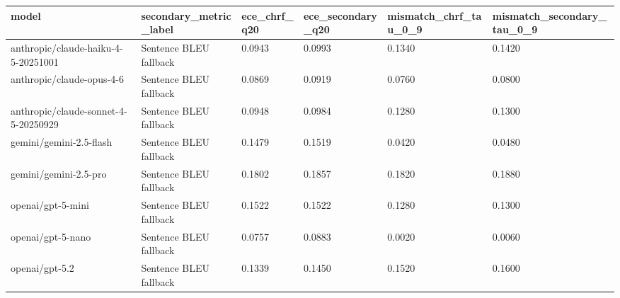 \begin{tabular}{llllll}
\toprule
model & secondary_metric_label & ece_chrf_q20 & ece_secondary_q20 & mismatch_chrf_tau_0_9 & mismatch_secondary_tau_0_9 \\
\midrule
anthropic/claude-haiku-4-5-20251001 & Sentence BLEU fallback & 0.0943 & 0.0993 & 0.1340 & 0.1420 \\
anthropic/claude-opus-4-6 & Sentence BLEU fallback & 0.0869 & 0.0919 & 0.0760 & 0.0800 \\
anthropic/claude-sonnet-4-5-20250929 & Sentence BLEU fallback & 0.0948 & 0.0984 & 0.1280 & 0.1300 \\
gemini/gemini-2.5-flash & Sentence BLEU fallback & 0.1479 & 0.1519 & 0.0420 & 0.0480 \\
gemini/gemini-2.5-pro & Sentence BLEU fallback & 0.1802 & 0.1857 & 0.1820 & 0.1880 \\
openai/gpt-5-mini & Sentence BLEU fallback & 0.1522 & 0.1522 & 0.1280 & 0.1300 \\
openai/gpt-5-nano & Sentence BLEU fallback & 0.0757 & 0.0883 & 0.0020 & 0.0060 \\
openai/gpt-5.2 & Sentence BLEU fallback & 0.1339 & 0.1450 & 0.1520 & 0.1600 \\
\bottomrule
\end{tabular}
